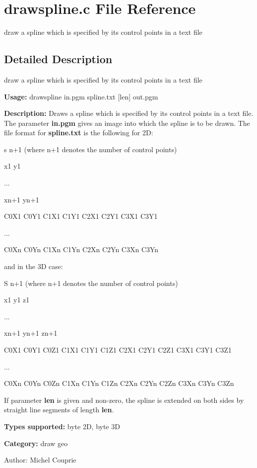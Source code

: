 \section{drawspline.c File Reference}
\label{drawspline_8c}
draw a spline which is specified by its control points in a text file 



\subsection{Detailed Description}
draw a spline which is specified by its control points in a text file 

{\bf Usage:} drawspline in.pgm spline.txt [len] out.pgm

{\bf Description:} Draws a spline which is specified by its control points in a text file. The parameter {\bf in.pgm} gives an image into which the spline is to be drawn. The file format for {\bf spline.txt} is the following for 2D:

s n+1 (where n+1 denotes the number of control points)\par
 x1 y1\par
 ...\par
 xn+1 yn+1\par
 C0X1 C0Y1 C1X1 C1Y1 C2X1 C2Y1 C3X1 C3Y1\par
 ...\par
 C0Xn C0Yn C1Xn C1Yn C2Xn C2Yn C3Xn C3Yn\par


and in the 3D case:

S n+1 (where n+1 denotes the number of control points)\par
 x1 y1 z1\par
 ...\par
 xn+1 yn+1 zn+1\par
 C0X1 C0Y1 C0Z1 C1X1 C1Y1 C1Z1 C2X1 C2Y1 C2Z1 C3X1 C3Y1 C3Z1\par
 ...\par
 C0Xn C0Yn C0Zn C1Xn C1Yn C1Zn C2Xn C2Yn C2Zn C3Xn C3Yn C3Zn\par


If parameter {\bf len} is given and non-zero, the spline is extended on both sides by straight line segments of length {\bf len}.

{\bf Types supported:} byte 2D, byte 3D

{\bf Category:} draw geo

\begin{Desc}
\item[Author:]Michel Couprie \end{Desc}
